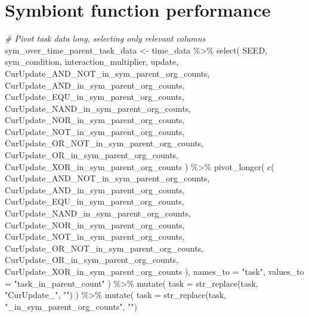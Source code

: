\documentclass[
]{book}
\newenvironment{Shaded}{\begin{snugshade}}{\end{snugshade}}
\newcommand{\AttributeTok}[1]{\textcolor[rgb]{0.77,0.63,0.00}{#1}}
\newcommand{\CommentTok}[1]{\textcolor[rgb]{0.56,0.35,0.01}{\textit{#1}}}
\newcommand{\FunctionTok}[1]{\textcolor[rgb]{0.00,0.00,0.00}{#1}}
\newcommand{\NormalTok}[1]{#1}
\newcommand{\OtherTok}[1]{\textcolor[rgb]{0.56,0.35,0.01}{#1}}
\newcommand{\SpecialCharTok}[1]{\textcolor[rgb]{0.00,0.00,0.00}{#1}}
\newcommand{\StringTok}[1]{\textcolor[rgb]{0.31,0.60,0.02}{#1}}
\begin{document}
\hypertarget{symbiont-function-performance}{%
\section{Symbiont function performance}\label{symbiont-function-performance}}

\begin{Shaded}
\begin{Highlighting}[]
\CommentTok{\# Pivot task data long, selecting only relevant columns}
\NormalTok{sym\_over\_time\_parent\_task\_data }\OtherTok{\textless{}{-}}\NormalTok{ time\_data }\SpecialCharTok{\%\textgreater{}\%}
  \FunctionTok{select}\NormalTok{(}
\NormalTok{    SEED,}
\NormalTok{    sym\_condition,}
\NormalTok{    interaction\_multiplier,}
\NormalTok{    update,}
\NormalTok{    CurUpdate\_AND\_NOT\_in\_sym\_parent\_org\_counts,}
\NormalTok{    CurUpdate\_AND\_in\_sym\_parent\_org\_counts,}
\NormalTok{    CurUpdate\_EQU\_in\_sym\_parent\_org\_counts,}
\NormalTok{    CurUpdate\_NAND\_in\_sym\_parent\_org\_counts,}
\NormalTok{    CurUpdate\_NOR\_in\_sym\_parent\_org\_counts,}
\NormalTok{    CurUpdate\_NOT\_in\_sym\_parent\_org\_counts,}
\NormalTok{    CurUpdate\_OR\_NOT\_in\_sym\_parent\_org\_counts,}
\NormalTok{    CurUpdate\_OR\_in\_sym\_parent\_org\_counts,}
\NormalTok{    CurUpdate\_XOR\_in\_sym\_parent\_org\_counts}
\NormalTok{  ) }\SpecialCharTok{\%\textgreater{}\%}
  \FunctionTok{pivot\_longer}\NormalTok{(}
    \FunctionTok{c}\NormalTok{(}
\NormalTok{      CurUpdate\_AND\_NOT\_in\_sym\_parent\_org\_counts,}
\NormalTok{      CurUpdate\_AND\_in\_sym\_parent\_org\_counts,}
\NormalTok{      CurUpdate\_EQU\_in\_sym\_parent\_org\_counts,}
\NormalTok{      CurUpdate\_NAND\_in\_sym\_parent\_org\_counts,}
\NormalTok{      CurUpdate\_NOR\_in\_sym\_parent\_org\_counts,}
\NormalTok{      CurUpdate\_NOT\_in\_sym\_parent\_org\_counts,}
\NormalTok{      CurUpdate\_OR\_NOT\_in\_sym\_parent\_org\_counts,}
\NormalTok{      CurUpdate\_OR\_in\_sym\_parent\_org\_counts,}
\NormalTok{      CurUpdate\_XOR\_in\_sym\_parent\_org\_counts}
\NormalTok{    ),}
    \AttributeTok{names\_to =} \StringTok{"task"}\NormalTok{,}
    \AttributeTok{values\_to =} \StringTok{"task\_in\_parent\_count"}
\NormalTok{  ) }\SpecialCharTok{\%\textgreater{}\%}
  \FunctionTok{mutate}\NormalTok{(}
    \AttributeTok{task =} \FunctionTok{str\_replace}\NormalTok{(task, }\StringTok{"CurUpdate\_"}\NormalTok{, }\StringTok{""}\NormalTok{)}
\NormalTok{  ) }\SpecialCharTok{\%\textgreater{}\%}
  \FunctionTok{mutate}\NormalTok{(}
    \AttributeTok{task =} \FunctionTok{str\_replace}\NormalTok{(task, }\StringTok{"\_in\_sym\_parent\_org\_counts"}\NormalTok{, }\StringTok{""}\NormalTok{)}

\end{Highlighting}
\end{Shaded}
\end{document}
